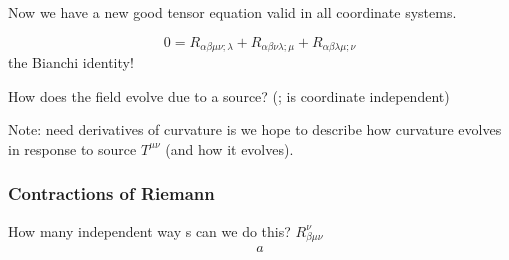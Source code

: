 \documentclass[a4paper]{article} %
\begin{document}
Now we have a new good tensor equation valid in all coordinate systems.

\begin{equation}
0=R_{\alpha\beta\mu\nu;\lambda}+R_{\alpha\beta\nu\lambda;\mu}+R_{\alpha\beta\lambda\mu;\nu}
\end{equation}
the Bianchi identity!

How does the field evolve due to a source? (; is coordinate independent)

Note: need derivatives of curvature is we hope to describe how curvature evolves in response to source $T^{\mu\nu}$ (and how it evolves).

\subsubsection{Contractions of Riemann}
How many independent way s can we do this? $R^{\nu}_{\beta\mu\nu}$
\begin{align}
a%
\end{align}




\end{document}

